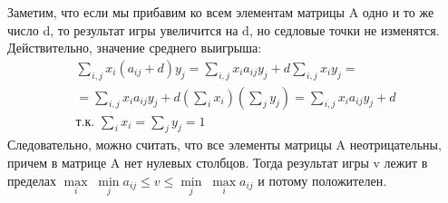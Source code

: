 Заметим, что если мы прибавим ко всем элементам матрицы A одно и то же число d, то результат игры увеличится на d, но седловые точки не изменятся. Действительно, значение среднего выигрыша:
$$\begin{gathered}
	\underset{i, j}{\overset{}{\sum}}x_i (a_{ij} + d) y_j = \underset{i,j}{\overset{}{\sum}}x_i a_{ij} y_j + d \underset{i, j}{\overset{}{\sum}} x_i y_j = \\
	= \underset{i, j}{\overset{}{\sum}}x_i a_{ij} y_j + d \left( \underset{i}{\overset{}{\sum}}x_i \right) \left( \underset{j}{\overset{}{\sum}}y_j \right) = \underset{i, j}{\overset{}{\sum}}x_i a_{ij} y_j + d \\
	\text{т.к. } \underset{i}{\overset{}{\sum}}x_i = \underset{j}{\overset{}{\sum}}y_j = 1
\end{gathered}$$
Следовательно, можно считать, что все элементы матрицы A неотрицательны, причем в матрице A нет нулевых столбцов. Тогда результат игры v лежит в пределах $\underset{i}{\max} \; \underset{j}{\min} a_{ij} \le v \le \underset{j}{\min} \; \underset{i}{\max} a_{ij}$ и потому положителен.

